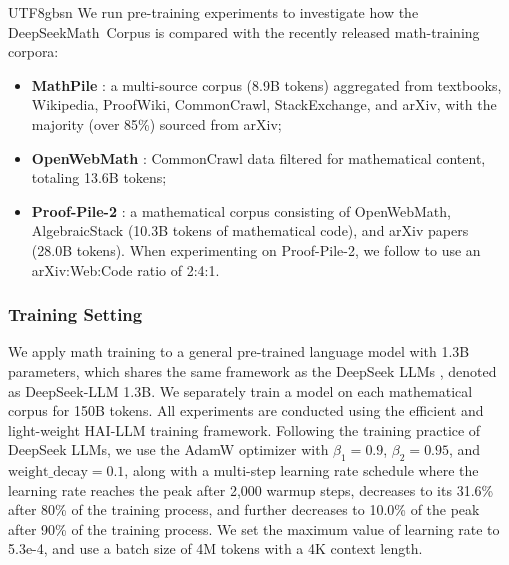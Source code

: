 \documentclass[11pt, a4paper, logo, copyright, nonumbering]{deepseek}
\newcommand{\spmath}{DeepSeekMath}
\begin{document}
\begin{CJK*}{UTF8}{gbsn}
We run pre-training experiments to investigate how the \spmath~Corpus is compared with the recently released math-training corpora:
\begin{itemize}[topsep=0pt]
    \item \textbf{MathPile} \citep{mathpile}: a multi-source corpus (8.9B tokens) aggregated from textbooks, Wikipedia, ProofWiki, CommonCrawl, StackExchange, and arXiv, with the majority (over 85\%) sourced from arXiv;
    \item \textbf{OpenWebMath} \citep{openwebmath}: CommonCrawl data filtered for mathematical content, totaling 13.6B tokens;
    \item \textbf{Proof-Pile-2} \citep{llemma}: a mathematical corpus consisting of OpenWebMath, AlgebraicStack (10.3B tokens of mathematical code), and arXiv papers (28.0B tokens).
    When experimenting on Proof-Pile-2, we follow \cite{llemma} to use an arXiv:Web:Code ratio of 2:4:1.
\end{itemize}

\subsubsection{Training Setting}
\label{sec:quality-policy}
We apply math training to a general pre-trained language model with 1.3B parameters, which shares the same framework as the DeepSeek LLMs \citep{deepseek-llm}, denoted as DeepSeek-LLM 1.3B.
We separately train a model on each mathematical corpus for 150B tokens. All experiments are conducted using the efficient and light-weight HAI-LLM \citep{haillm} training framework.
Following the training practice of DeepSeek LLMs, we use the AdamW optimizer \citep{adamW} with $\beta_1=0.9$, $\beta_2=0.95$, and $\mathrm{weight\_decay}=0.1$, along with a multi-step learning rate schedule where the learning rate reaches the peak after 2,000 warmup steps, decreases to its 31.6\% after 80\% of the training process, and further decreases to 10.0\% of the peak after 90\% of the training process.
We set the maximum value of learning rate to 5.3e-4, and use a batch size of 4M tokens with a 4K context length.


\end{CJK*}
\end{document}
